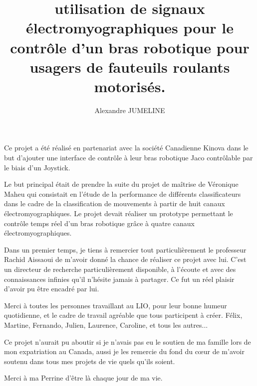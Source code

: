 \documentclass[letterpaper, twoside, 12pt, memoire, creativecommons, hyperref]{thETS}
\title{utilisation de signaux électromyographiques pour le contrôle d'un bras robotique pour usagers de fauteuils roulants motorisés.}
\author{Alexandre JUMELINE}
\begin{document}

\maketitle

\presentjury

\begin{avantpropos}
Ce projet a été réalisé en partenariat avec la société Canadienne Kinova dans le but d'ajouter une interface de contrôle à leur bras robotique Jaco contrôlable par le biais d'un Joystick. 

Le but principal était de prendre la suite du projet de maîtrise de Véronique Maheu qui consistait en l'étude de la performance de différents classificateurs dans le cadre de la classification de mouvements à partir de huit canaux électromyographiques. Le projet devait réaliser un prototype permettant le contrôle temps réel d'un bras robotique grâce à quatre canaux électromyographiques.

\end{avantpropos}

\begin{remerciements}
Dans un premier temps, je tiens à remercier tout particulièrement le professeur Rachid Aissaoui de m'avoir donné la chance de réaliser ce projet avec lui. C'est un directeur de recherche particulièrement disponible, à l'écoute et avec des connaissances infinies qu'il n'hésite jamais à partager. Ce fut un réel plaisir d'avoir pu être encadré par lui.

Merci à toutes les personnes travaillant au LIO, pour leur bonne humeur quotidienne, et le cadre de travail agréable que tous participent à créer. Félix, Martine, Fernando, Julien, Laurence, Caroline, et tous les autres...

Ce projet n'aurait pu aboutir si je n'avais pas eu le soutien de ma famille lors de mon expatriation au Canada, aussi je les remercie du fond du cœur de m'avoir soutenu dans tous mes projets de vie quels qu'ils soient.

Merci à ma Perrine d'être là chaque jour de ma vie.
\end{remerciements}
\end{document}
